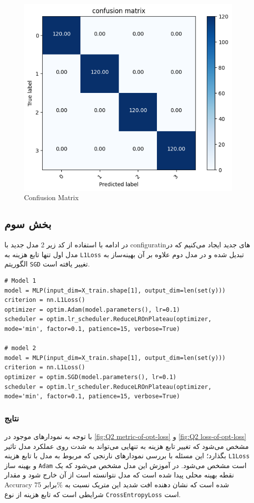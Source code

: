 \documentclass{article}
\begin{document}
\begin{figure}[H]
\centering
\includegraphics[width=0.5\linewidth]{"img/Q2/cm basic"}
\caption{Confiusion Matrix}
\label{fig:Q2 cm basic}
\end{figure}

\subsection{بخش سوم}

در ادامه با استفاده از کد زیر 2 مدل جدید با 
configuratinهای 
جدید ایجاد می‌کنیم که در مدل اول تنها تابع هزینه به 
\texttt{L1Loss}
تبدیل شده و در مدل دوم علاوه بر آن بهینه‌ساز به الگوریتم 
\texttt{SGD}
تغییر یافته است.
\begin{LTR}  
	\begin{lstlisting}       
# Model 1
model = MLP(input_dim=X_train.shape[1], output_dim=len(set(y)))
criterion = nn.L1Loss()
optimizer = optim.Adam(model.parameters(), lr=0.1)
scheduler = optim.lr_scheduler.ReduceLROnPlateau(optimizer, mode='min', factor=0.1, patience=15, verbose=True)

# model 2
model = MLP(input_dim=X_train.shape[1], output_dim=len(set(y)))
criterion = nn.L1Loss()
optimizer = optim.SGD(model.parameters(), lr=0.1)
scheduler = optim.lr_scheduler.ReduceLROnPlateau(optimizer, mode='min', factor=0.1, patience=15, verbose=True)
	\end{lstlisting}
\end{LTR}         
        
\subsubsection{نتایج}

 با توجه به نمودارهای موجود در 
\autoref{fig:Q2 metric-of-opt-loss} و \autoref{fig:Q2 loss-of-opt-loss}
مشخص می‌شود که تغییر تابع هزینه به تنهایی می‌تواند به شدت روی عملکرد مدل تاثیر بگذارد؛ این مسئله با بررسی نمودارهای نارنجی که مربوط به مدل با تابع هزینه
\texttt{L1Loss} و 
بهینه ساز
\texttt{Adam}
است مشخص می‌شود. در آموزش این مدل مشخص می‌شود که یک نقطه بهینه محلی پیدا شده است که مدل نتوانسته است از آن خارج شود و مقدار 
Accuracy
برابر 75‎\% شده است که نشان دهنده افت شدید این متریک نسبت به شرایطی است که تابع هزینه از نوع
\texttt{CrossEntropyLoss}
است.
\end{document}
